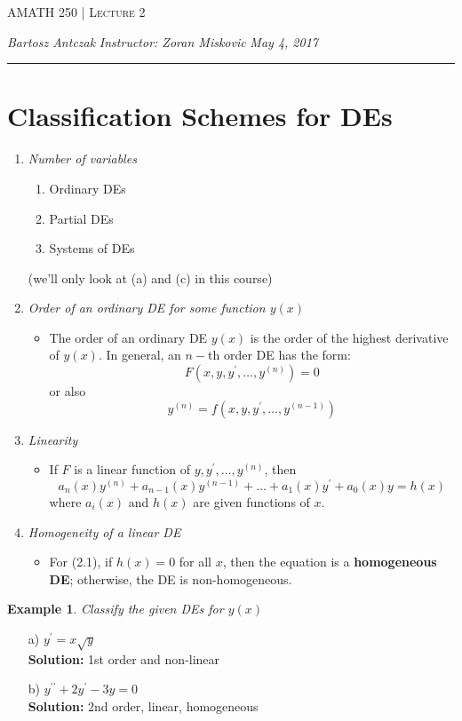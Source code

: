 \documentclass{report}
\newcommand{\lectureNum}{2}
\newcommand{\curDate}{May 4, 2017}
\newcommand{\course}{AMATH 250}
\newcommand{\instructor}{Zoran Miskovic}
\newtheorem{ex}{Example}[section]
\begin{document}
\begin{center}
\begin{Large}
\textsc{\course{} | Lecture \lectureNum{}}
\end{Large}
\end{center} 
\noindent \textit{Bartosz Antczak} \hfill
\textit{Instructor: \instructor{}} \hfill
\textit{\curDate{}}
\rule{\textwidth}{0.4pt}
\section{Classification Schemes for DEs}
\begin{enumerate}
    \item \textit{Number of variables}
    \begin{enumerate}
        \item Ordinary DEs
        \item Partial DEs
        \item Systems of DEs
    \end{enumerate}
    (we'll only look at (a) and (c) in this course)
    \item \textit{Order of an ordinary DE for some function $y(x)$}
    \begin{itemize}
        \item The order of an ordinary DE $y(x)$ is the order of the highest derivative of $y(x)$. In general, an $n-$th order DE has the form:
        $$F(x, y, y^\prime, \ldots, y^{(n)}) = 0$$
        or also
        $$y^{(n)} = f(x, y, y^\prime, \ldots, y^{(n-1)})$$
    \end{itemize}
    \item \textit{Linearity}
    \begin{itemize}
    \item 
    If $F$ is a linear function of $y, y^\prime, \ldots, y^{(n)}$, then 
    \begin{equation}
    a_n(x) y^{(n)} + a_{n-1}(x) y^{(n-1)} + \ldots + a_1(x) y^\prime + a_0(x) y = h(x)
    \end{equation}
    where $a_i(x)$ and $h(x)$ are given functions of $x$.
    \end{itemize}
    \item \textit{Homogeneity of a linear DE}
    \begin{itemize}
        \item For (2.1), if $h(x) = 0$ for all $x$, then the equation is a \textbf{homogeneous DE}; otherwise, the DE is non-homogeneous. 
    \end{itemize}
\end{enumerate}
\begin{ex}
Classify the given DEs for $y(x)$
\end{ex}
\begin{enumerate}
    \item[a)] 
$y^\prime = x\sqrt{y}$ \\
\textbf{Solution:} 1st order and non-linear

    \item[b)] $y^{\prime\prime} + 2y^\prime - 3y = 0$ \\ \textbf{Solution:} 2nd order, linear, homogeneous
\end{enumerate}
\end{document}
